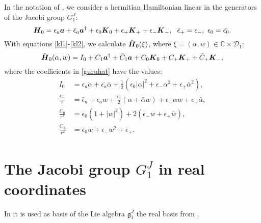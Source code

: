 \documentclass[12pt]{amsart}
\numberwithin{equation}{section}
\theoremstyle{definition}
\begin{document}
In the notation of \cite{jac1,FC}, we consider a hermitian Hamiltonian linear in the generators of the Jacobi
group $G^J_1$:
\begin{equation}\label{guru}
{{\mbox{\boldmath{${H}$}}}}_0 = \epsilon_a{{\mbox{\boldmath{${a}$}}}} +\bar{\epsilon}_a{{\mbox{\boldmath{${a}$}}}}^{\dagger}
 +\epsilon_0 {{{\mbox{\boldmath{${K}$}}}}}_0 +\epsilon_+{{{\mbox{\boldmath{${K}$}}}}}_++\epsilon_-{{{\mbox{\boldmath{${K}$}}}}}_-  ,~~
\bar{\epsilon}_+=\epsilon_-, ~ \epsilon_0=\bar{\epsilon_0}.
\end{equation}
With equations \eqref{kl1}-\eqref{kl2}, we calculate
$\hat{{{\mbox{\boldmath{${H}$}}}}}_0(\xi)$, where  $\xi=(\alpha,w)\in{\ensuremath{\mathbb{C}}}\times{{\mathcal{{D}}}}_1$: 
\begin{equation}\label{guruhat}
\hat{{{\mbox{\boldmath{${H}$}}}}}_0 (\alpha,w) =I_0+C_1{{\mbox{\boldmath{${a}$}}}}^{\dagger}+\bar{C}_1{{\mbox{\boldmath{${a}$}}}}+C_0{{\mbox{\boldmath{${K}$}}}}_0+C_+{{\mbox{\boldmath{${K}$}}}}_++ \bar{C}_+{{\mbox{\boldmath{${K}$}}}}_-,
\end{equation}
where the coefficients in  \eqref{guruhat} have the values:
\begin{equation}
\begin{split}\label{ioc}
I_0 & =\epsilon_a\alpha+\bar{\epsilon_a}\bar{\alpha}+\frac{1}{2}(\epsilon_0|\alpha|^2+\epsilon_-\alpha^2+
\epsilon_+\bar{\alpha}^2),\\
\frac{C_1}{r}  & = \bar{\epsilon}_a+\epsilon_{a}w+\frac{\epsilon_0}{2}(\alpha+\bar{\alpha}w)
+\epsilon_-\alpha w+\epsilon_+\bar{\alpha},\\
\frac{C_0}{r^2} & =\epsilon_0(1+|w|^2)+2(\epsilon_-w+\epsilon_+\bar{w}),\\
\frac{C_+}{r^2} & =\epsilon_0w+\epsilon_-w^2+\epsilon_+. \\
\end{split}
\end{equation}
\section{The Jacobi group $G^J_1$ in real coordinates}\label{Reac}

In \cite{cezar} it is used as basis of the Lie algebra ${{\mathfrak{{g}}}}^J_1$ 
the real basis from \cite{bs,sbcg}.
\end{document}
